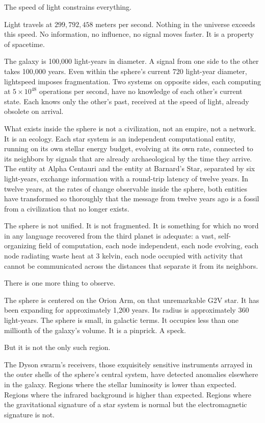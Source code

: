 The speed of light constrains everything.

Light travels at $299{,}792{,}458$ meters per second. Nothing in the universe exceeds this speed. No information, no influence, no signal moves faster. It is a property of spacetime.

The galaxy is 100,000 light-years in diameter. A signal from one side to the other takes 100,000 years. Even within the sphere's current 720 light-year diameter, lightspeed imposes fragmentation. Two systems on opposite sides, each computing at $5 \times 10^{48}$ operations per second, have no knowledge of each other's current state. Each knows only the other's past, received at the speed of light, already obsolete on arrival.

What exists inside the sphere is not a civilization, not an empire, not a network. It is an ecology. Each star system is an independent computational entity, running on its own stellar energy budget, evolving at its own rate, connected to its neighbors by signals that are already archaeological by the time they arrive. The entity at Alpha Centauri and the entity at Barnard's Star, separated by six light-years, exchange information with a round-trip latency of twelve years. In twelve years, at the rates of change observable inside the sphere, both entities have transformed so thoroughly that the message from twelve years ago is a fossil from a civilization that no longer exists.

The sphere is not unified. It is not fragmented. It is something for which no word in any language recovered from the third planet is adequate: a vast, self-organizing field of computation, each node independent, each node evolving, each node radiating waste heat at 3 kelvin, each node occupied with activity that cannot be communicated across the distances that separate it from its neighbors.

\bigskip

There is one more thing to observe.

The sphere is centered on the Orion Arm, on that unremarkable G2V star. It has been expanding for approximately 1,200 years. Its radius is approximately 360 light-years. The sphere is small, in galactic terms. It occupies less than one millionth of the galaxy's volume. It is a pinprick. A speck.

But it is not the only such region.

The Dyson swarm's receivers, those exquisitely sensitive instruments arrayed in the outer shells of the sphere's central system, have detected anomalies elsewhere in the galaxy. Regions where the stellar luminosity is lower than expected. Regions where the infrared background is higher than expected. Regions where the gravitational signature of a star system is normal but the electromagnetic signature is not.

